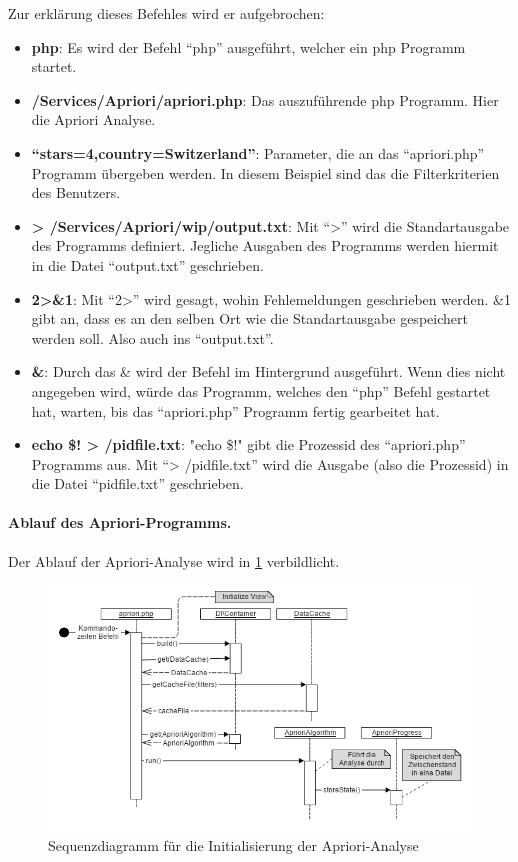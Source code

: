 Zur erklärung dieses Befehles wird er aufgebrochen:
\begin{itemize}
	\item \textbf{php}: Es wird der Befehl "`php"' ausgeführt, welcher ein \gls{php} Programm startet.
	\item \textbf{/Services/Apriori/apriori.php}: Das auszuführende \gls{php} Programm. Hier die Apriori Analyse.
	\item \textbf{``stars=4,country=Switzerland''}: Parameter, die an das "`apriori.php"' Programm übergeben werden. In diesem Beispiel sind das die Filterkriterien des Benutzers.
	\item \textbf{> /Services/Apriori/wip/output.txt}: Mit "`>"' wird die Standartausgabe des Programms definiert. Jegliche Ausgaben des Programms werden hiermit in die Datei "`output.txt"' geschrieben.
	\item \textbf{2>\&1}: Mit "`2>"' wird gesagt, wohin Fehlemeldungen geschrieben werden. \&1 gibt an, dass es an den selben Ort wie die Standartausgabe gespeichert werden soll. Also auch ins "`output.txt"'.
	\item \textbf{\&}: Durch das \& wird der Befehl im Hintergrund ausgeführt. Wenn dies nicht angegeben wird, würde das Programm, welches den "`php"' Befehl gestartet hat, warten, bis das "`apriori.php"' Programm fertig gearbeitet hat.
	\item \textbf{echo \$! > /pidfile.txt}: "echo \$!" gibt die Prozessid des "`apriori.php"' Programms aus. Mit "`> /pidfile.txt"' wird die Ausgabe (also die Prozessid) in die Datei "`pidfile.txt"' geschrieben.
\end{itemize}

\paragraph{Ablauf des Apriori-Programms.}
Der Ablauf der Apriori-Analyse wird in \cref{fig:proofofconcept:architektur:hintergrundprozesser:1} verbildlicht.

\begin{figure}[H]
	\centering
	\includegraphics[width=1\textwidth]{images/diagram-sequence-apriori}
	\caption{Sequenzdiagramm für die Initialisierung der Apriori-Analyse}
	\label{fig:proofofconcept:architektur:hintergrundprozesser:1}
\end{figure}

